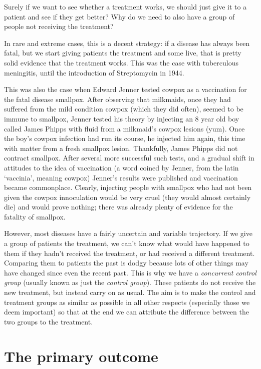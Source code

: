 \documentclass[
  openany]{book}
\theoremstyle{definition}
\theoremstyle{definition}
\theoremstyle{definition}
\theoremstyle{definition}
\theoremstyle{remark}
\begin{document}
Surely if we want to see whether a treatment works, we should just give it to a patient and see if they get better? Why do we need to also have a group of people not receiving the treatment?

In rare and extreme cases, this is a decent strategy: if a disease has always been fatal, but we start giving patients the treatment and some live, that is pretty solid evidence that the treatment works. This was the case with tuberculous meningitis, until the introduction of Streptomycin in 1944.

This was also the case when Edward Jenner tested cowpox as a vaccination for the fatal disease smallpox. After observing that milkmaids, once they had suffered from the mild condition cowpox (which they did often), seemed to be immune to smallpox, Jenner tested his theory by injecting an 8 year old boy called James Phipps with fluid from a milkmaid's cowpox lesions (yum). Once the boy's cowpox infection had run its course, he injected him again, this time with matter from a fresh smallpox lesion. Thankfully, James Phipps did not contract smallpox. After several more successful such tests, and a gradual shift in attitudes to the idea of vaccination (a word coined by Jenner, from the latin `vaccinia', meaning cowpox) Jenner's results were published and vaccination became commonplace. Clearly, injecting people with smallpox who had not been given the cowpox innoculation would be very cruel (they would almost certainly die) and would prove nothing; there was already plenty of evidence for the fatality of smallpox.

However, most diseases have a fairly uncertain and variable trajectory. If we give a group of patients the treatment, we can't know what would have happened to them if they hadn't received the treatment, or had received a different treatment. Comparing them to patients the past is dodgy because lots of other things may have changed since even the recent past. This is why we have a \emph{concurrent control group} (usually known as just the \emph{control group}). These patients do not receive the new treatment, but instead carry on as usual. The aim is to make the control and treatment groups as similar as possible in all other respects (especially those we deem important) so that at the end we can attribute the difference between the two groups to the treatment.

\section{The primary outcome}\label{primout}
\end{document}
